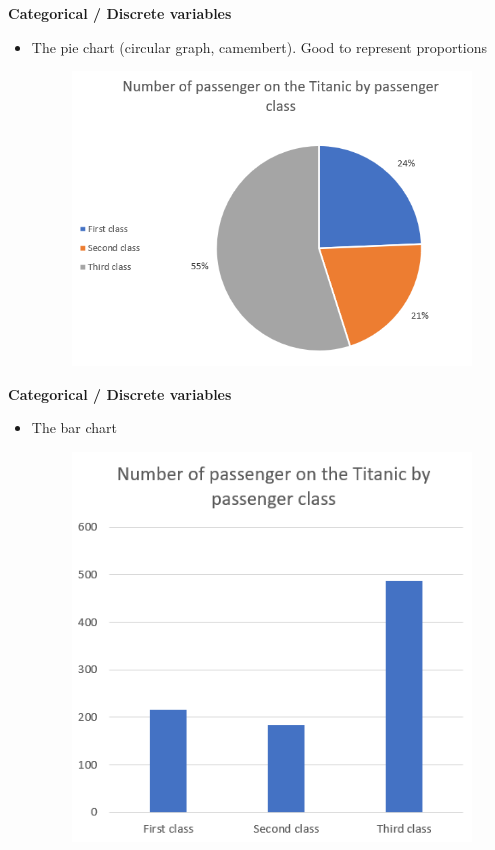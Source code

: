 \documentclass[compress]{beamer}
\begin{document}
\begin{frame}
	\textbf{Categorical / Discrete variables}
	\begin{itemize}
		\item The pie chart (circular graph, camembert). Good to represent proportions
		\begin{figure}
            \centering
            \includegraphics[scale=0.6]{Picture/Titanic pie chart.PNG}
        \end{figure}
	\end{itemize}
\end{frame}

\begin{frame}
	\textbf{Categorical / Discrete variables}
	\begin{itemize}
		\item The bar chart
		\begin{figure}
            \centering
            \includegraphics[scale=0.6]{Picture/Titanic bar chart.PNG}
        \end{figure}
	\end{itemize}
\end{frame}
\end{document}
